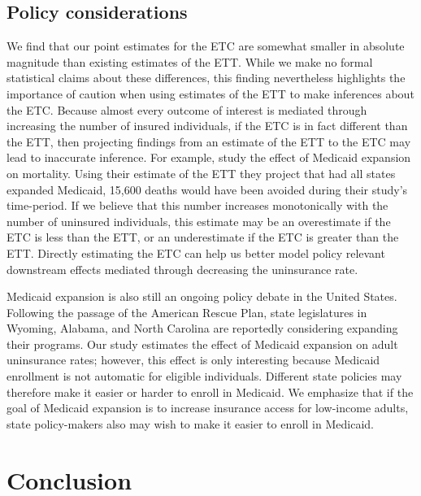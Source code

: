 \documentclass[aoas]{imsart}
\theoremstyle{plain}
\theoremstyle{remark}
\begin{document}
\subsection{Policy considerations}

We find that our point estimates for the ETC are somewhat smaller in absolute magnitude than existing estimates of the ETT. While we make no formal statistical claims about these differences, this finding nevertheless highlights the importance of caution when using estimates of the ETT to make inferences about the ETC. Because almost every outcome of interest is mediated through increasing the number of insured individuals, if the ETC is in fact different than the ETT, then projecting findings from an estimate of the ETT to the ETC may lead to inaccurate inference. For example, \cite{miller2019medicaid} study the effect of Medicaid expansion on mortality. Using their estimate of the ETT they project that had all states expanded Medicaid, 15,600 deaths would have been avoided during their study's time-period. If we believe that this number increases monotonically with the number of uninsured individuals, this estimate may be an overestimate if the ETC is less than the ETT, or an underestimate if the ETC is greater than the ETT. Directly estimating the ETC can help us better model policy relevant downstream effects mediated through decreasing the uninsurance rate. 

Medicaid expansion is also still an ongoing policy debate in the United States. Following the passage of the American Rescue Plan, state legislatures in Wyoming, Alabama, and North Carolina are reportedly considering expanding their programs. Our study estimates the effect of Medicaid expansion on adult uninsurance rates; however, this effect is only interesting because Medicaid enrollment is not automatic for eligible individuals. Different state policies may therefore make it easier or harder to enroll in Medicaid. We emphasize that if the goal of Medicaid expansion is to increase insurance access for low-income adults, state policy-makers also may wish to make it easier to enroll in Medicaid. 

\section{Conclusion}
\end{document}
